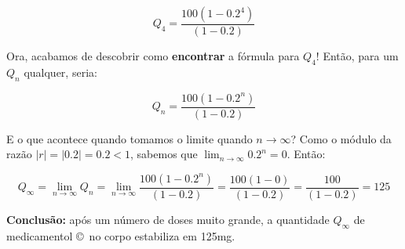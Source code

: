 \documentclass[a4paper]{article}
\begin{document}
\begin{displaymath}
  Q_4 = \frac{100(1-0.2^4)}{(1-0.2)}
\end{displaymath}

Ora, acabamos de descobrir como {\bf encontrar} a fórmula para $Q_4$!
Então, para um $Q_n$ qualquer, seria:

\begin{displaymath}
  Q_n = \frac{100(1-0.2^n)}{(1-0.2)}
\end{displaymath}

E o que acontece quando tomamos o limite quando $n\rightarrow \infty$?
Como o módulo da razão $|r| = |0.2| = 0.2 <1$, sabemos que
$\lim_{n\rightarrow\infty}0.2^n=0$. Então:

\begin{displaymath}
  Q_\infty = \lim_{n\rightarrow\infty} Q_n =
  \lim_{n\rightarrow\infty}\frac{100(1-0.2^n)}{(1-0.2)} = \frac{100(1-0)}{(1-0.2)}=\frac{100}{(1-0.2)}=125
\end{displaymath}

{\bf Conclusão:} após um número de doses muito grande, a quantidade
$Q_\infty$ de medicamentol \copyright\ no corpo estabiliza em 125mg.
\end{document}
